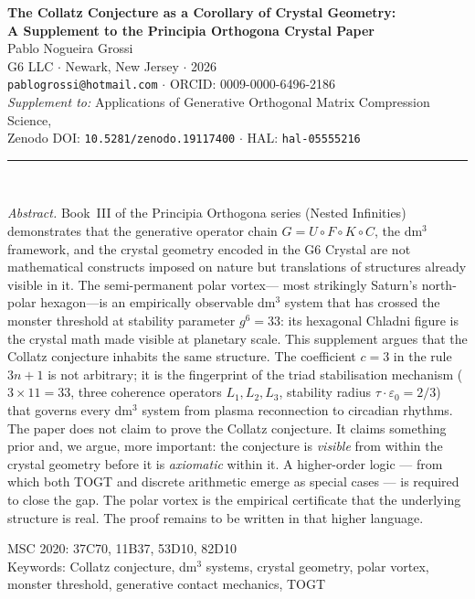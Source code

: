 \documentclass[11pt]{article}
\theoremstyle{plain}
\theoremstyle{definition}
\begin{document}
\thispagestyle{empty}
\begin{center}
{\large\bfseries\color{PrincipiaDark}
The Collatz Conjecture as a Corollary of Crystal Geometry:\\[4pt]
A Supplement to the Principia Orthogona Crystal Paper}\\[16pt]

{\normalsize Pablo Nogueira Grossi}\\[4pt]
{\small G6 LLC $\cdot$ Newark, New Jersey $\cdot$ 2026}\\[4pt]
{\small\texttt{pablogrossi@hotmail.com}
$\cdot$ ORCID: 0009-0000-6496-2186}\\[8pt]

{\small\textit{Supplement to:} Applications of Generative Orthogonal
Matrix Compression Science,\\
Zenodo DOI: \texttt{10.5281/zenodo.19117400}
$\cdot$ HAL: \texttt{hal-05555216}}\\[12pt]

{\color{PrincipiaGold}\rule{4in}{0.6pt}}\\[12pt]

\begin{minipage}{4.5in}
\small\textit{Abstract.}
Book~III of the Principia Orthogona series (Nested Infinities) demonstrates
that the generative operator chain $G = U \circ F \circ K \circ C$,
the dm$^3$ framework, and the crystal geometry encoded in the G6 Crystal
are not mathematical constructs imposed on nature but translations of
structures already visible in it. The semi-permanent polar vortex---
most strikingly Saturn's north-polar hexagon---is an empirically
observable dm$^3$ system that has crossed the monster threshold at
stability parameter $g^6 = 33$: its hexagonal Chladni figure is the
crystal math made visible at planetary scale. This supplement argues
that the Collatz conjecture inhabits the same structure.
The coefficient $c = 3$ in the rule $3n+1$ is not arbitrary; it is the
fingerprint of the triad stabilisation mechanism ($3 \times 11 = 33$,
three coherence operators $L_1, L_2, L_3$, stability radius
$\tau \cdot \varepsilon_0 = 2/3$) that governs every dm$^3$ system
from plasma reconnection to circadian rhythms. The paper does not
claim to prove the Collatz conjecture. It claims something prior and,
we argue, more important: the conjecture is \textit{visible} from
within the crystal geometry before it is \textit{axiomatic} within it.
A higher-order logic --- from which both TOGT and discrete arithmetic
emerge as special cases --- is required to close the gap. The polar
vortex is the empirical certificate that the underlying structure is
real. The proof remains to be written in that higher language.
\end{minipage}

\medskip
{\small MSC 2020: 37C70, 11B37, 53D10, 82D10}\\[4pt]
{\small Keywords: Collatz conjecture, dm$^3$ systems, crystal geometry,
polar vortex, monster threshold, generative contact mechanics, TOGT}
\end{center}
\end{document}
